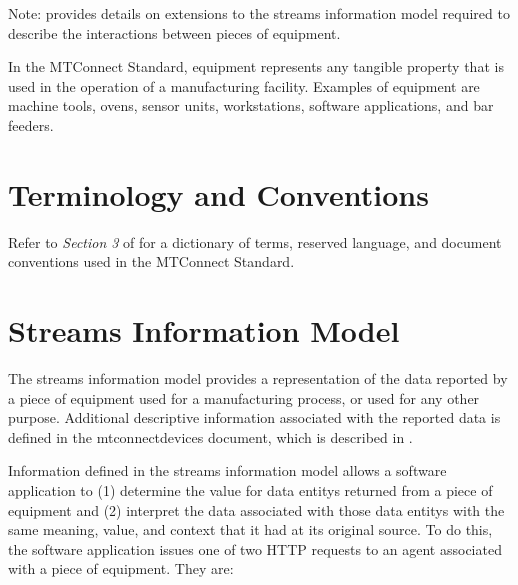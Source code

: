 \documentclass{mtconnect}	%
\begin{document}
\begin{note}
Note:  provides details on extensions to the \gls{streams information model} required to describe the interactions between pieces of equipment.
\end{note}

In the MTConnect Standard, equipment represents any tangible property that is used in the operation of a manufacturing facility.  Examples of equipment are machine tools, ovens, sensor units, workstations, software applications, and bar feeders.

\section{Terminology and Conventions}
Refer to \textit{Section 3} of  for a dictionary of terms, reserved language, and document conventions used in the MTConnect Standard.

\printglossary

\printacronyms  

\printbibliography[title=MTConnect References,keyword=MTC]

\printbibliography[title=Other References,notkeyword=MTC]

\section{Streams Information Model}
\label{sec:Streams Information Model}

The \gls{streams information model} provides a representation of the data reported by a piece of equipment used for a manufacturing process, or used for any other purpose.  Additional descriptive information associated with the reported data is defined in the \gls{mtconnectdevices} document, which is described in .

Information defined in the \gls{streams information model} allows a software application to (1) determine the value for \glspl{data entity} returned from a piece of equipment and (2) interpret the data associated with those \glspl{data entity} with the same meaning, value, and context that it had at its original source.  To do this, the software application issues one of two HTTP requests to an \gls{agent} associated with a piece of equipment.  They are:
\end{document}
